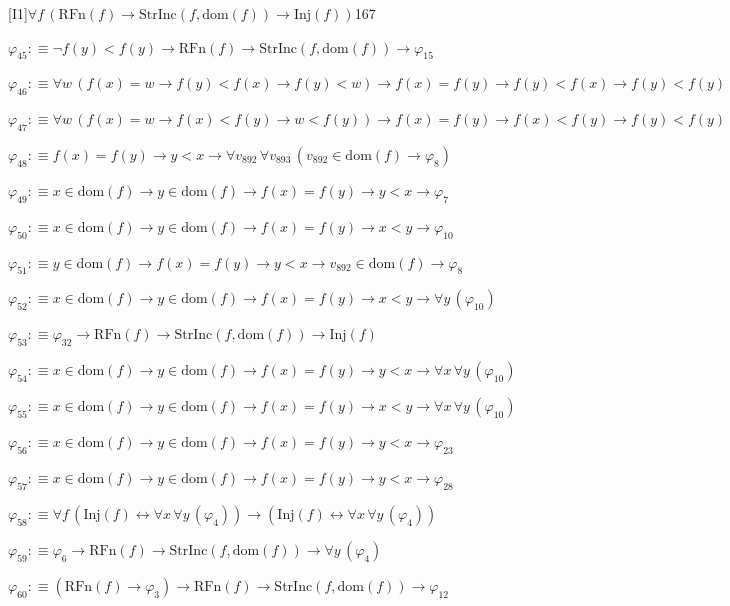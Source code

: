 \begin{fullproof}{[I1]}{$\forall f\,(\mathrm{RFn}(f) \to \mathrm{StrInc}(f,\mathrm{dom}(f)) \to \mathrm{Inj}(f))$}{167}
\begin{abbrevlist}
\item $\varphi_{45} :\equiv \neg f(y) < f(y) \to \mathrm{RFn}(f) \to \mathrm{StrInc}(f,\mathrm{dom}(f)) \to \varphi_{15}$
\item $\varphi_{46} :\equiv \forall w\,(f(x) = w \to f(y) < f(x) \to f(y) < w) \to f(x) = f(y) \to f(y) < f(x) \to f(y) < f(y)$
\item $\varphi_{47} :\equiv \forall w\,(f(x) = w \to f(x) < f(y) \to w < f(y)) \to f(x) = f(y) \to f(x) < f(y) \to f(y) < f(y)$
\item $\varphi_{48} :\equiv f(x) = f(y) \to y < x \to \forall v_{892}\,\forall v_{893}\,(v_{892} \in \mathrm{dom}(f) \to \varphi_{8})$
\item $\varphi_{49} :\equiv x \in \mathrm{dom}(f) \to y \in \mathrm{dom}(f) \to f(x) = f(y) \to y < x \to \varphi_{7}$
\item $\varphi_{50} :\equiv x \in \mathrm{dom}(f) \to y \in \mathrm{dom}(f) \to f(x) = f(y) \to x < y \to \varphi_{10}$
\item $\varphi_{51} :\equiv y \in \mathrm{dom}(f) \to f(x) = f(y) \to y < x \to v_{892} \in \mathrm{dom}(f) \to \varphi_{8}$
\item $\varphi_{52} :\equiv x \in \mathrm{dom}(f) \to y \in \mathrm{dom}(f) \to f(x) = f(y) \to x < y \to \forall y\,(\varphi_{10})$
\item $\varphi_{53} :\equiv \varphi_{32} \to \mathrm{RFn}(f) \to \mathrm{StrInc}(f,\mathrm{dom}(f)) \to \mathrm{Inj}(f)$
\item $\varphi_{54} :\equiv x \in \mathrm{dom}(f) \to y \in \mathrm{dom}(f) \to f(x) = f(y) \to y < x \to \forall x\,\forall y\,(\varphi_{10})$
\item $\varphi_{55} :\equiv x \in \mathrm{dom}(f) \to y \in \mathrm{dom}(f) \to f(x) = f(y) \to x < y \to \forall x\,\forall y\,(\varphi_{10})$
\item $\varphi_{56} :\equiv x \in \mathrm{dom}(f) \to y \in \mathrm{dom}(f) \to f(x) = f(y) \to y < x \to \varphi_{23}$
\item $\varphi_{57} :\equiv x \in \mathrm{dom}(f) \to y \in \mathrm{dom}(f) \to f(x) = f(y) \to y < x \to \varphi_{28}$
\item $\varphi_{58} :\equiv \forall f\,(\mathrm{Inj}(f) \leftrightarrow \forall x\,\forall y\,(\varphi_{4})) \to (\mathrm{Inj}(f) \leftrightarrow \forall x\,\forall y\,(\varphi_{4}))$
\item $\varphi_{59} :\equiv \varphi_{6} \to \mathrm{RFn}(f) \to \mathrm{StrInc}(f,\mathrm{dom}(f)) \to \forall y\,(\varphi_{4})$
\item $\varphi_{60} :\equiv (\mathrm{RFn}(f) \to \varphi_{3}) \to \mathrm{RFn}(f) \to \mathrm{StrInc}(f,\mathrm{dom}(f)) \to \varphi_{12}$

\end{abbrevlist}
\end{fullproof}
